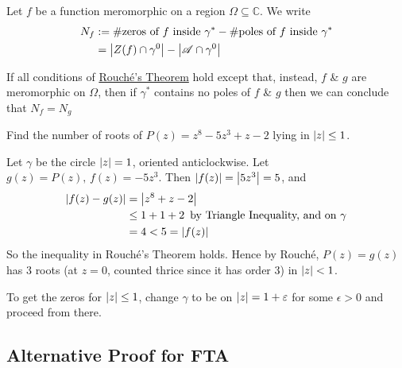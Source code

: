 \documentclass[notoc,notitlepage]{tufte-book}
\begin{document}
\begin{note}[Notation]
  Let $f$ be a function meromorphic on a region $\Omega \subseteq \mathbb{C}$. We write
  \begin{align*}
    N_f &:= \#\text{zeros of } f \text{ inside } \gamma^* - \#\text{poles of } f \text{ inside } \gamma^* \\
      &= \left|Z(f) \cap \gamma^0\right| - \left|\mathscr{A} \cap \gamma^0\right|
  \end{align*}
\end{note}

\begin{remark}
  If all conditions of \hyperref[thm:rouche_s_theorem]{Rouch\'e's Theorem} hold except that, instead, $f$ \& $g$ are meromorphic on $\Omega$, then if $\gamma^*$ contains no poles of $f$ \& $g$ then we can conclude that $N_f = N_g$
\end{remark}

\begin{ex}
  Find the number of roots of $P(z) = z^8 - 5z^3 + z - 2$ lying in $\left|z\right| \leq 1$.

  \begin{solution}
    Let $\gamma$ be the circle $\left|z\right| = 1$, oriented anticlockwise. Let $g(z) = P(z), \, f(z) = -5z^3$. Then $\left|f(z)\right| = \left|5z^3\right| = 5$, and
    \begin{align*}
      \left|f(z) - g(z)\right| &= \left|z^8 + z - 2\right| \\
        &\leq 1 + 1 + 2 \enspace \text{by Triangle Inequality, and on } \gamma \\
        &= 4 < 5 = \left|f(z)\right|
    \end{align*}
    So the inequality in Rouch\'e's Theorem holds. Hence by Rouch\'e, $P(z) = g(z)$ has $3$ roots (at $z = 0$, counted thrice since it has order $3$) in $\left|z\right| < 1$.

    To get the zeros for $\left|z\right| \leq 1$, change $\gamma$ to be on $\left|z\right| = 1 + \varepsilon$ for some $\epsilon > 0$ and proceed from there.
  \end{solution}
\end{ex}


\subsection{Alternative Proof for FTA} %
\label{sub:alternative_proof_for_fta}
\end{document}
